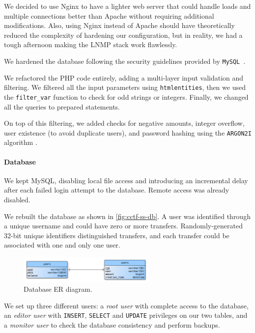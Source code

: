 We decided to use Nginx to have a lighter web server that could handle loads and multiple connections better than Apache without requiring additional modifications. Also, using Nginx instead of Apache should have theoretically reduced the complexity of hardening our configuration, but in reality, we had a tough afternoon making the LNMP stack work flawlessly.

We hardened the database following the security guidelines provided by \texttt{MySQL}~\cite{Mysql:securityguidelines}.

We refactored the PHP code entirely, adding a multi-layer input validation and filtering. We filtered all the input parameters using \texttt{htmlentities}, then we used the \texttt{filter\_var} function to check for odd strings or integers. Finally, we changed all the queries to prepared statements.

On top of this filtering, we added checks for negative amounts, integer overflow, user existence (to avoid duplicate users), and password hashing using the \texttt{ARGON2I} algorithm \cite{argon2i}.

\paragraph{Database}
\label{sec:cctf-secure:def-prep:database}

We kept MySQL, disabling local file access and introducing an incremental delay after each failed login attempt to the database. Remote access was already disabled.

We rebuilt the database as shown in \autoref{fig:cctf-ss-db}. A user was identified through a unique username and could have zero or more transfers. Randomly-generated 32-bit unique identifiers distinguished transfers, and each transfer could be associated with one and only one user.

\begin{figure}[h]
    \centering
    \includegraphics[width=0.6\textwidth]{drawable/db_diagram.png}
    \captionsetup{justification=centering}
    \caption{Database ER diagram.}
    \label{fig:cctf-ss-db}
\end{figure}

We set up three different users: a \textit{root user} with complete access to the database, an \textit{editor user} with \texttt{INSERT}, \texttt{SELECT} and \texttt{UPDATE} privileges on our two tables, and a \textit{monitor user} to check the database consistency and perform backups.


